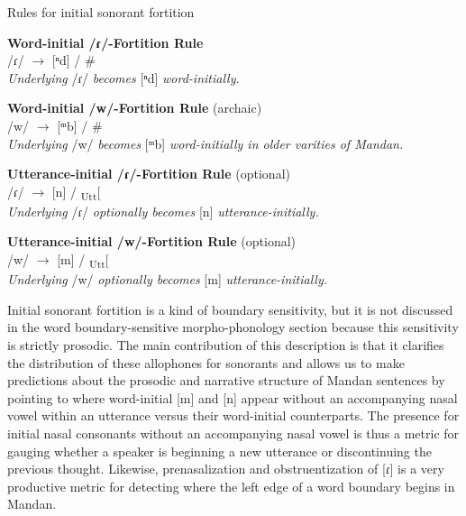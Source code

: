 \begin{exe}
\item\label{sonorantallophonyfinal} Rules for initial sonorant fortition

	\begin{xlist}
		\item \textbf{Word-initial /ɾ/-Fortition Rule}\\
		/ɾ/ $\to$ [ⁿd] / \#{\longrule}\\
		\textit{Underlying} /ɾ/ \textit{becomes} [ⁿd] \textit{word-initially.}

		\item \textbf{Word-initial /w/-Fortition Rule} (archaic)\\
		/w/ $\to$ [ᵐb] / \#{\longrule}\\
		\textit{Underlying} /w/ \textit{becomes} [ᵐb] \textit{word-initially in older varities of Mandan.}

		\item \textbf{Utterance-initial /ɾ/-Fortition Rule} (optional)\\
		/ɾ/ $\to$ [n] / \textsubscript{Utt}[{\longrule}\\
		\textit{Underlying} /ɾ/ \textit{optionally becomes} [n] \textit{utterance-initially.}

		\item \textbf{Utterance-initial /w/-Fortition Rule} (optional)\\
		/w/ $\to$ [m] / \textsubscript{Utt}[{\longrule}\\
		\textit{Underlying} /w/ \textit{optionally becomes} [m] \textit{utterance-initially.}
	\end{xlist}

\end{exe}

Initial sonorant fortition is a kind of boundary sensitivity, but it is not discussed in the word boundary-sensitive morpho-phonology section because this sensitivity is strictly prosodic. The main contribution of this description is that it clarifies the distribution of these allophones for sonorants and allows us to make predictions about the prosodic and narrative structure of Mandan sentences by pointing to where word-initial [m] and [n] appear without an accompanying nasal vowel within an utterance versus their word-initial counterparts. The presence for initial nasal consonants without an accompanying nasal vowel is thus a metric for gauging whether a speaker is beginning a new utterance or discontinuing the previous thought. Likewise, prenasalization and obstruentization of [ɾ] is a very productive metric for detecting where the left edge of a word boundary begins in Mandan.

